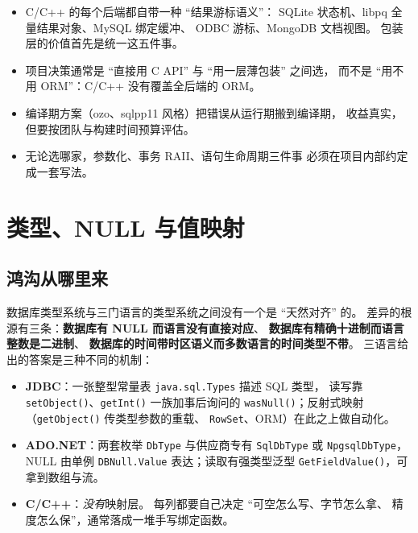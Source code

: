 \documentclass[12pt,a4paper,fontset=fandol]{ctexbook}
\newcommand{\Fn}[1]{\texttt{#1()}}
\newcommand{\Tp}[1]{\texttt{#1}}
\newcommand{\CppJava}{C/C++}
\begin{document}
\begin{guideline}[title=本章要点]
\begin{itemize}
  \item \CppJava{} 的每个后端都自带一种 ``结果游标语义''：
        SQLite 状态机、libpq 全量结果对象、MySQL 绑定缓冲、
        ODBC 游标、MongoDB 文档视图。
        包装层的价值首先是统一这五件事。
  \item 项目决策通常是 ``直接用 C API'' 与 ``用一层薄包装'' 之间选，
        而不是 ``用不用 ORM''：\CppJava{} 没有覆盖全后端的 ORM。
  \item 编译期方案（ozo、sqlpp11 风格）把错误从运行期搬到编译期，
        收益真实，但要按团队与构建时间预算评估。
  \item 无论选哪家，参数化、事务 RAII、语句生命周期三件事
        必须在项目内部约定成一套写法。
\end{itemize}
\end{guideline}


\chapter{类型、NULL 与值映射}

\section{鸿沟从哪里来}

数据库类型系统与三门语言的类型系统之间没有一个是 ``天然对齐'' 的。
差异的根源有三条：\textbf{数据库有 NULL 而语言没有直接对应}、
\textbf{数据库有精确十进制而语言整数是二进制}、
\textbf{数据库的时间带时区语义而多数语言的时间类型不带}。
三语言给出的答案是三种不同的机制：

\begin{itemize}
  \item \textbf{JDBC}：一张整型常量表 \Tp{java.sql.Types} 描述 SQL 类型，
        读写靠 \Fn{setObject}、\Fn{getInt} 一族加事后询问的
        \Fn{wasNull}；反射式映射（\Fn{getObject} 传类型参数的重载、
        \Tp{RowSet}、ORM）在此之上做自动化。
  \item \textbf{ADO.NET}：两套枚举 \Tp{DbType} 与供应商专有
        \Tp{SqlDbType} 或 \Tp{NpgsqlDbType}，NULL 由单例
        \Tp{DBNull.Value} 表达；读取有强类型泛型
        \Fn{GetFieldValue}，可拿到数组与流。
  \item \textbf{\CppJava{}}：\emph{没有}映射层。
        每列都要自己决定 ``可空怎么写、字节怎么拿、
        精度怎么保''，通常落成一堆手写绑定函数。
\end{itemize}
\end{document}
